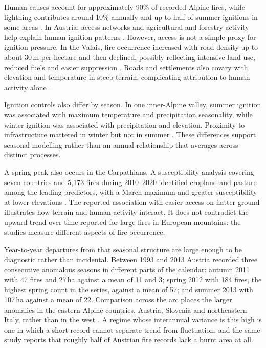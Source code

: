 \documentclass[11pt,a4paper]{article}
\begin{document}
Human causes account for approximately 90\% of recorded Alpine fires, while lightning contributes around 10\% annually and up to half of summer ignitions in some areas \citep{muller_forest_2020, valese_wildfires_2011}. In Austria, access networks and agricultural and forestry activity help explain human ignition patterns \citep{arndt_modeling_2013}. However, access is not a simple proxy for ignition pressure. In the Valais, fire occurrence increased with road density up to about 30\,m per hectare and then declined, possibly reflecting intensive land use, reduced fuels and easier suppression \citep{zumbrunnen_human_2012}. Roads and settlements also covary with elevation and temperature in steep terrain, complicating attribution to human activity alone \citep{bekar_crossregional_2020}.

Ignition controls also differ by season. In one inner-Alpine valley, summer ignition was associated with maximum temperature and precipitation seasonality, while winter ignition was associated with precipitation and elevation. Proximity to infrastructure mattered in winter but not in summer \citep{vacchiano_modeling_2018}. These differences support seasonal modelling rather than an annual relationship that averages across distinct processes.

A spring peak also occurs in the Carpathians. A susceptibility analysis covering seven countries and 5{,}173 fires during 2010--2020 identified cropland and pasture among the leading predictors, with a March maximum and greater susceptibility at lower elevations \citep{manczinger_fire_2025}. The reported association with easier access on flatter ground illustrates how terrain and human activity interact. It does not contradict the upward trend over time reported for large fires in European mountains: the studies measure different aspects of fire occurrence.

Year-to-year departures from that seasonal structure are large enough to be diagnostic rather than incidental. Between 1993 and 2013 Austria recorded three consecutive anomalous seasons in different parts of the calendar: autumn 2011 with 47 fires and 27\,ha against a mean of 11 and 3; spring 2012 with 184 fires, the highest spring count in the series, against a mean of 57; and summer 2013 with 107\,ha against a mean of 22. Comparison across the arc places the larger anomalies in the eastern Alpine countries, Austria, Slovenia and northeastern Italy, rather than in the west \citep{muller_anomalies_2015}. A regime whose interannual variance is this high is one in which a short record cannot separate trend from fluctuation, and the same study reports that roughly half of Austrian fire records lack a burnt area at all.
\end{document}
